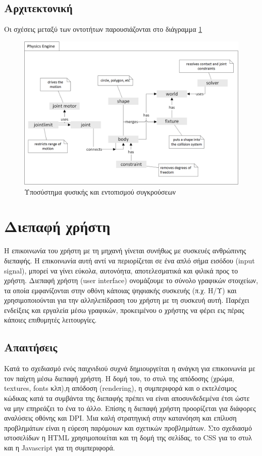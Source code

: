 \subsection{Αρχιτεκτονική}
Οι σχέσεις μεταξύ των οντοτήτων παρουσιάζονται στο διάγραμμα \ref{fig:physics_abstract}
	\begin{figure}[h!]
		\centering
		\includegraphics[width=165mm]{Images/physics_overview}
		\caption{Υποσύστημα φυσικής και εντοπισμού συγκρούσεων}
		\label{fig:physics_abstract}
	\end{figure}
	
\section{Διεπαφή χρήστη}
Η επικοινωνία του χρήστη με τη μηχανή γίνεται συνήθως με συσκευές ανθρώπινης διεπαφής. Η επικοινωνία αυτή αντί να περιορίζεται σε ένα απλό σήμα εισόδου (input signal), μπορεί να γίνει εύκολα, αυτονόητα, αποτελεσματικά και φιλικά προς το χρήστη. Διεπαφή χρήστη (user interface) ονομάζουμε το σύνολο γραφικών στοιχείων, τα οποία εμφανίζονται στην οθόνη κάποιας ψηφιακής συσκευής (π.χ. Η/Υ) και χρησιμοποιούνται για την αλληλεπίδραση του χρήστη με τη συσκευή αυτή. Παρέχει ενδείξεις και εργαλεία μέσω γραφικών, προκειμένου ο χρήστης να φέρει εις πέρας κάποιες επιθυμητές λειτουργίες.

\subsection{Απαιτήσεις}
Κατά το σχεδιασμό ενός παιχνιδιού συχνά δημιουργείται η ανάγκη για επικοινωνία με τον παίχτη μέσω διεπαφή χρήστη. Η δομή του, το στυλ της απόδοσης (χρώμα, textures, fonts κλπ),η απόδοση (rendering), η συμπεριφορά και ο εκτελέσιμος κώδικας κατά τα συμβάντα της διεπαφής πρέπει να είναι αποσυνδεδεμένα έτσι ώστε να μην επηρεάζει το ένα το άλλο. Επίσης η διεπαφή χρήστη προορίζεται για διάφορες αναλύσεις οθόνης και \Gls{DPI}. Μια καλή στρατηγική στην κατανόηση και επίλυση προβλημάτων είναι η εύρεση παρόμοιων και σχετικών προβλημάτων. Στο σχεδιασμό ιστοσελίδων η HTML χρησιμοποιείται και τη δομή της σελίδας, το CSS για το στυλ και η Javascript για τη συμπεριφορά.

